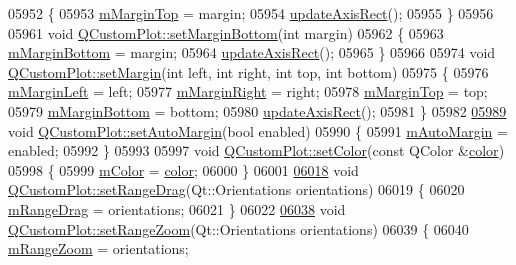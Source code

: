 \begin{DoxyCode}
05952 \{
05953   \hyperlink{a00116_a746a9e31a0cf3ce3be1bbd3a6fa2c8be}{mMarginTop} = margin;
05954   \hyperlink{a00116_a428242419d3a1b63f2cbff637986c35c}{updateAxisRect}();
05955 \}
05956 
05961 \textcolor{keywordtype}{void} \hyperlink{a00116_a87d42c0b0a224f9f9e43013fff4199d9}{QCustomPlot::setMarginBottom}(\textcolor{keywordtype}{int} margin)
05962 \{
05963   \hyperlink{a00116_ad02e2d81ae66d4261d1e46a6979ea118}{mMarginBottom} = margin;
05964   \hyperlink{a00116_a428242419d3a1b63f2cbff637986c35c}{updateAxisRect}();
05965 \}
05966 
05974 \textcolor{keywordtype}{void} \hyperlink{a00116_a870fac53de3ba7bd9d71b45238b0eaeb}{QCustomPlot::setMargin}(\textcolor{keywordtype}{int} left, \textcolor{keywordtype}{int} right, \textcolor{keywordtype}{int} top, \textcolor{keywordtype}{int} bottom)
05975 \{
05976   \hyperlink{a00116_a011307bfbe2ac7e60f13d2fa45e31113}{mMarginLeft} = left;
05977   \hyperlink{a00116_af5efe5736378d5f8061fd6bf5dc92a2d}{mMarginRight} = right;
05978   \hyperlink{a00116_a746a9e31a0cf3ce3be1bbd3a6fa2c8be}{mMarginTop} = top;
05979   \hyperlink{a00116_ad02e2d81ae66d4261d1e46a6979ea118}{mMarginBottom} = bottom;
05980   \hyperlink{a00116_a428242419d3a1b63f2cbff637986c35c}{updateAxisRect}();
05981 \}
05982 
\hypertarget{a00115_source_l05989}{}\hyperlink{a00116_aed5bb30c9b04c1d0103ab8ef7190f23a}{05989} \textcolor{keywordtype}{void} \hyperlink{a00116_aed5bb30c9b04c1d0103ab8ef7190f23a}{QCustomPlot::setAutoMargin}(\textcolor{keywordtype}{bool} enabled)
05990 \{
05991   \hyperlink{a00116_a9f5c2927e8dd4f66342f80d3b332cd3f}{mAutoMargin} = enabled;
05992 \}
05993 
05997 \textcolor{keywordtype}{void} \hyperlink{a00116_a858bbcf98637471449e438304a00624b}{QCustomPlot::setColor}(\textcolor{keyword}{const} QColor &\hyperlink{a00116_ae35093fbf4f645dcefd930ca8c68b622}{color})
05998 \{
05999   \hyperlink{a00116_ac071280171e215ffc7d416118bc28d90}{mColor} = \hyperlink{a00116_ae35093fbf4f645dcefd930ca8c68b622}{color};
06000 \}
06001 
\hypertarget{a00115_source_l06018}{}\hyperlink{a00116_aa0e1c44295da2706d0f12ad48f64b806}{06018} \textcolor{keywordtype}{void} \hyperlink{a00116_aa0e1c44295da2706d0f12ad48f64b806}{QCustomPlot::setRangeDrag}(Qt::Orientations orientations)
06019 \{
06020   \hyperlink{a00116_a8cc4277431ae5ab8e15cf2dfe5c17e1c}{mRangeDrag} = orientations;
06021 \}
06022 
\hypertarget{a00115_source_l06038}{}\hyperlink{a00116_ad4a0919e471549a2daea517ce6538ad8}{06038} \textcolor{keywordtype}{void} \hyperlink{a00116_ad4a0919e471549a2daea517ce6538ad8}{QCustomPlot::setRangeZoom}(Qt::Orientations orientations)
06039 \{
06040   \hyperlink{a00116_ac12a0fb503fccb899d786ceaa0a1a4f7}{mRangeZoom} = orientations;

\end{DoxyCode}
